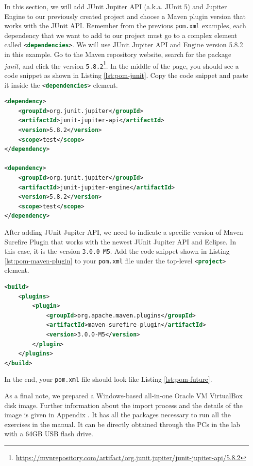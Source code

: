 In this section, we will add JUnit Jupiter API (a.k.a. JUnit 5) and Jupiter Engine to our previously created project and choose a Maven plugin version that works with the JUnit API. Remember from the previous \lstinline[language={}]|pom.xml| examples, each dependency that we want to add to our project must go to a complex element called \lstinline[language=XML]|<dependencies>|. We will use JUnit Jupiter API and Engine version 5.8.2 in this example. Go to the Maven repository website, search for the package \emph{junit}, and click the version \lstinline[language={}]|5.8.2|\footnote{\url{https://mvnrepository.com/artifact/org.junit.jupiter/junit-jupiter-api/5.8.2}}. In the middle of the page, you should see a code snippet as shown in Listing \ref{lst:pom-junit}. Copy the code snippet and paste it inside the \lstinline[language=XML]|<dependencies>| element.

\begin{lstlisting}[language=XML,caption={JUnit Jupiter API and Engine version 5.8.2 dependency elements.},label=lst:pom-junit]
<dependency>
    <groupId>org.junit.jupiter</groupId>
    <artifactId>junit-jupiter-api</artifactId>
    <version>5.8.2</version>
    <scope>test</scope>
</dependency>

<dependency>
    <groupId>org.junit.jupiter</groupId>
    <artifactId>junit-jupiter-engine</artifactId>
    <version>5.8.2</version>
    <scope>test</scope>
</dependency>
\end{lstlisting}

After adding JUnit Jupiter API, we need to indicate a specific version of Maven Surefire Plugin that works with the newest JUnit Jupiter API and Eclipse. In this case, it is the version \lstinline[language={}]|3.0.0-M5|. Add the code snippet shown in Listing \ref{lst:pom-maven-plugin} to your \lstinline[language={}]|pom.xml| file under the top-level \lstinline[language=XML]|<project>| element.

\begin{lstlisting}[language=XML,caption={A compatible Maven Surefire Plugin with Eclipse and JUnit Jupiter API v5.8.2..},label=lst:pom-maven-plugin]
<build>
    <plugins>
        <plugin>
            <groupId>org.apache.maven.plugins</groupId>
            <artifactId>maven-surefire-plugin</artifactId>
            <version>3.0.0-M5</version>
        </plugin>
    </plugins>
</build>
\end{lstlisting}

In the end, your \lstinline|pom.xml| file should look like Listing \ref{lst:pom-future}.



As a final note, we prepared a Windows-based all-in-one Oracle VM VirtualBox disk image. Further information about the import process and the details of the image is given in Appendix . It has all the packages necessary to run all the exercises in the manual. It can be directly obtained through the PCs in the lab with a 64GB USB flash drive.